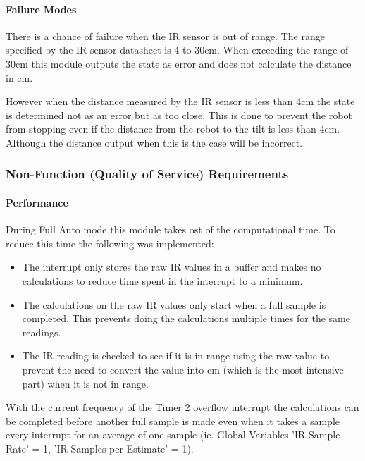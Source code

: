 \documentclass[MTRX3700report.tex]{subfiles}
\begin{document}
\paragraph{Failure Modes}
There is a chance of failure when the IR sensor is out of range. The range specified by the IR sensor datasheet is 4 to 30cm. When exceeding the range of 30cm this module outputs the state as error and does not calculate the distance in cm. 

However when the distance measured by the IR sensor is less than 4cm the state is determined not as an error but as too close. This is done to prevent the robot from stopping even if the distance from the robot to the tilt is less than 4cm. Although the distance output when this is the case will be incorrect.  

\subsubsection{Non-Function (Quality of Service) Requirements}
\paragraph{Performance}
During Full Auto mode this module takes ost of the computational time. To reduce this time the following was implemented:
\begin{itemize}
	\item The interrupt only stores the raw IR values in a buffer and makes no calculations to reduce time spent in the interrupt to a minimum.
	\item The calculations on the raw IR values only start when a full sample is completed. This prevents doing the calculations multiple times for the same readings.
	\item The IR reading is checked to see if it is in range using the raw value to prevent the need to convert the value into cm (which is the most intensive part) when it is not in range. 
\end{itemize}
With the current frequency of the Timer 2 overflow interrupt the calculations can be completed before another full sample is made even when it takes a sample every interrupt for an average of one sample (ie. Global Variables 'IR Sample Rate' = 1,  'IR Samples per Estimate' = 1).
\end{document}
